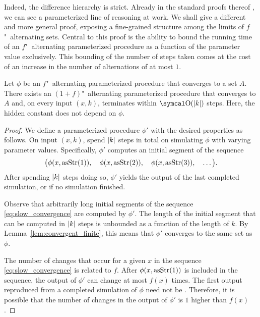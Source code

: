 Indeed, the difference hierarchy is strict.
Already in the standard proofs thereof \parencite{arslanov1997degree,ershov1968hierarchyi,putnam1965trial}, we can see a parameterized line of reasoning at work.
We shall give a different and more general proof, exposing a fine-grained structure among the limits of $f$"~alternating sets.
Central to this proof is the ability to bound the running time of an $f$"~alternating parameterized procedure as a function of the parameter value exclusively.
This bounding of the number of steps taken comes at the cost of an increase in the number of alternations of at most $1$.
\begin{theorem}
\label{thm:slow_convergence}%
  Let $\phi$ be an $f$"~alternating parameterized procedure that converges to a set $A$.
  There exists an $(1 + f)$"~alternating parameterized procedure that converges to $A$ and, on every input $(x, k)$, terminates within $\bigO(\length{k})$ steps.
  Here, the hidden constant does not depend on $\phi$.
\end{theorem}
\begin{proof}
  We define a parameterized procedure $\phi'$ with the desired properties as follows.
  On input $(x, k)$, spend ${\lvert k\rvert}$ steps in total on simulating $\phi$ with varying parameter values.
  Specifically, $\phi'$ computes an initial segment of the sequence
  \begin{equation}
  \label{eq:slow_convergence}
    \big(\phi(x, \operatorname{asStr}(1)),\quad \phi(x, \operatorname{asStr}(2)),\quad \phi(x, \operatorname{asStr}(3)), \quad \ldots\big).
  \end{equation}
  After spending ${\lvert k\rvert}$ steps doing so, $\phi'$ yields the output of the last completed simulation, or  if no simulation finished.

  Observe that arbitrarily long initial segments of the sequence \eqref{eq:slow_convergence} are computed by $\phi'$.
  The length of the initial segment that can be computed in ${\lvert k\rvert}$ steps is unbounded as a function of the length of $k$.
  By Lemma~\ref{lem:convergent_finite}, this means that $\phi'$ converges to the same set as $\phi$.

  The number of changes that occur for a given $x$ in the sequence \eqref{eq:slow_convergence} is related to $f$.
  After $\phi(x, \operatorname{asStr}(1))$ is included in the sequence, the output of $\phi'$ can change at most $f(x)$ times.
  The first output reproduced from a completed simulation of $\phi$ need not be .
  Therefore, it is possible that the number of changes in the output of $\phi'$ is $1$ higher than $f(x)$.
\end{proof}

